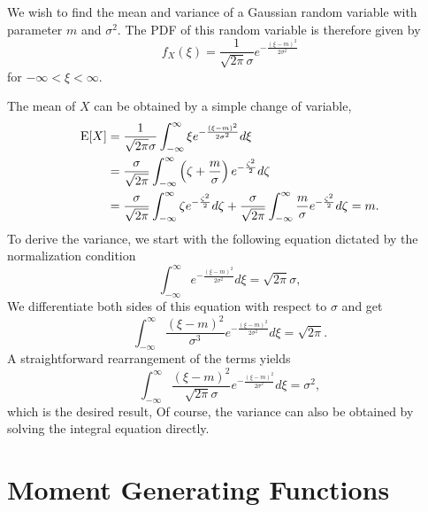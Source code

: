\begin{example}
We wish to find the mean and variance of a Gaussian random variable with parameter $m$ and $\sigma^2$.
The PDF of this random variable is therefore given by
\begin{equation*}
f_X (\xi) = \frac{1}{\sqrt{2 \pi} \sigma} e^{-\frac{(\xi - m)^2}{2\sigma^2}}
\end{equation*}
for $- \infty < \xi < \infty$.

The mean of $X$ can be obtained by a simple change of variable,
\begin{equation*}
\begin{split}
\mathrm{E} [X]
&= \frac{1}{\sqrt{2 \pi} \sigma} \int_{- \infty}^{\infty} \xi e^{-\frac{(\xi-m)^2}{2\sigma^2}} d\xi \\
&= \frac{\sigma}{\sqrt{2 \pi}} \int_{- \infty}^{\infty}
\left( \zeta+\frac{m}{\sigma} \right) e^{-\frac{\zeta^2}{2}} d\zeta \\
&= \frac{\sigma}{\sqrt{2 \pi}} \int_{- \infty}^{\infty}
\zeta e^{-\frac{\zeta^2}{2}} d\zeta
+ \frac{\sigma}{\sqrt{2 \pi}} \int_{- \infty}^{\infty}
\frac{m}{\sigma} e^{-\frac{\zeta^2}{2}} d\zeta
= m.
\end{split}
\end{equation*}
To derive the variance, we start with the following equation dictated by the normalization condition
\begin{equation*}
\int_{-\infty}^{\infty} e^{- \frac{(\xi-m)^2}{2 \sigma^2}} d\xi
= \sqrt{2 \pi} \sigma ,
\end{equation*}
We differentiate both sides of this equation with respect to $\sigma$ and get
\begin{equation*}
\int_{-\infty}^{\infty} \frac{(\xi-m)^2}{\sigma^3}
e^{- \frac{(\xi-m)^2}{2 \sigma^2}} d\xi
= \sqrt{2 \pi} .
\end{equation*}
A straightforward rearrangement of the terms yields
\begin{equation*}
\int_{-\infty}^{\infty} \frac{(\xi-m)^2}{\sqrt{2 \pi} \sigma}
e^{- \frac{(\xi-m)^2}{2 \sigma^2}} d\xi
= \sigma^2 ,
\end{equation*}
which is the desired result,
Of course, the variance can also be obtained by solving the integral equation directly.
\end{example}


\section{Moment Generating Functions}

